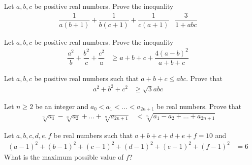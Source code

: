 \documentclass{subfile}
\begin{document}
		\begin{problem}[$2006$, problem $1$]
			Let $a,b,c$ be positive real numbers. Prove the inequality
				\begin{align*}
					\dfrac{1}{a(b+1)}+\dfrac{1}{b(c+1)}+\dfrac{1}{c(a+1)}
						& \dfrac{3}{1+abc}
				\end{align*}
		\end{problem}
	
		\begin{problem}[$2005$, problem $3$]
			Let $a,b,c$ be positive real numbers. Prove the inequality
				\begin{align*}
					\dfrac{a^{2}}{b}+\dfrac{b^{2}}{c}+\dfrac{c^{2}}{a}
						& \geq a+b+c+\dfrac{4(a-b)^{2}}{a+b+c}
				\end{align*}
		\end{problem}
	
		\begin{problem}[$2001$, problem $3$]
			Let $a,b,c$ be positive real numbers such that $a+b+c\leq abc$. Prove that
				\begin{align*}
					a^{2}+b^{2}+c^{2}
						& \geq \sqrt{3}abc
				\end{align*}
		\end{problem}
	
		\begin{problem}[$1998$, problem $2$]
			Let $n\geq2$ be an integer and $a_{0}<a_{1}<\ldots<a_{2n+1}$ be real numbers. Prove that
				\begin{align*}
					\sqrt[n]{a_{1}}-\sqrt[n]{a_{2}}+\ldots+\sqrt[n]{a_{2n+1}}
						& < \sqrt[n]{a_{1}-a_{2}+\ldots+a_{2n+1}}
				\end{align*}
		\end{problem}
	
		\begin{problem}[$1993$, problem $1$]
			Let $a,b,c,d,e,f$ be real numbers such that $a+b+c+d+e+f=10$ and
				\begin{align*}
					(a-1)^{2}+(b-1)^{2}+(c-1)^{2}+(d-1)^{2}+(e-1)^{2}+(f-1)^{2}
						& = 6
				\end{align*}
			What is the maximum possible value of $f$?
		\end{problem}
\end{document}

